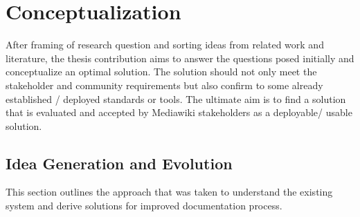 \chapter{Conceptualization}\label{chapter:Conceptualization}
\indent After framing of research question and sorting ideas from related work and literature, the thesis contribution aims to answer the questions posed initially and conceptualize an optimal solution. The solution should not only meet the stakeholder and community requirements but also confirm to some already established / deployed standards or tools. The ultimate aim is to find a solution that is evaluated and accepted by Mediawiki stakeholders as a deployable/ usable solution. 
\section{Idea Generation and Evolution}
\indent This section outlines the approach that was taken to understand the existing system and derive solutions for improved documentation process. 

